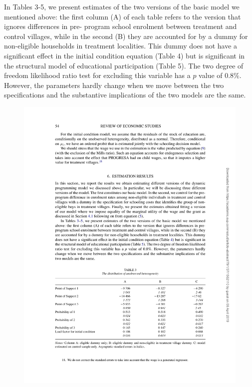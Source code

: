 \documentclass{handoutForSolutions}
\begin{document}
In Tables 3-5, we present estimates of the two versions of the basic model we mentioned above: the first column (A) of each table refers to the version that ignores differences in pre- program school enrolment between treatment and control villages, while in the second (B) they are accounted for by a dummy for non-eligible households in treatment localities. This dummy does not have a significant effect in the initial condition equation (Table 4) but is significant in the structural model of educational participation (Table 5). The two degree of freedom likelihood ratio test for excluding this variable has a $p$ value of 0.8\%. However, the parameters hardly change when we move between the two specifications and the substantive implications of the two models are the same.
\begin{figure}[H]
\centering
\includegraphics[width=1\linewidth]{image/AttanasioMeghir Santiago2011Figure3.pdf}
\end{figure}
\end{document}
